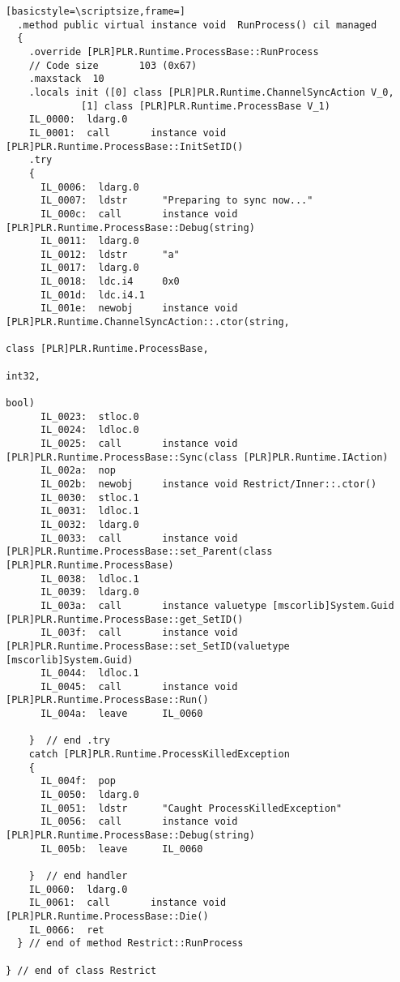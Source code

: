 \begin{lstlisting}[basicstyle=\scriptsize,frame=]
  .method public virtual instance void  RunProcess() cil managed
  {
    .override [PLR]PLR.Runtime.ProcessBase::RunProcess
    // Code size       103 (0x67)
    .maxstack  10
    .locals init ([0] class [PLR]PLR.Runtime.ChannelSyncAction V_0,
             [1] class [PLR]PLR.Runtime.ProcessBase V_1)
    IL_0000:  ldarg.0
    IL_0001:  call       instance void [PLR]PLR.Runtime.ProcessBase::InitSetID()
    .try
    {
      IL_0006:  ldarg.0
      IL_0007:  ldstr      "Preparing to sync now..."
      IL_000c:  call       instance void [PLR]PLR.Runtime.ProcessBase::Debug(string)
      IL_0011:  ldarg.0
      IL_0012:  ldstr      "a"
      IL_0017:  ldarg.0
      IL_0018:  ldc.i4     0x0
      IL_001d:  ldc.i4.1
      IL_001e:  newobj     instance void [PLR]PLR.Runtime.ChannelSyncAction::.ctor(string,
                                                                                   class [PLR]PLR.Runtime.ProcessBase,
                                                                                   int32,
                                                                                   bool)
      IL_0023:  stloc.0
      IL_0024:  ldloc.0
      IL_0025:  call       instance void [PLR]PLR.Runtime.ProcessBase::Sync(class [PLR]PLR.Runtime.IAction)
      IL_002a:  nop
      IL_002b:  newobj     instance void Restrict/Inner::.ctor()
      IL_0030:  stloc.1
      IL_0031:  ldloc.1
      IL_0032:  ldarg.0
      IL_0033:  call       instance void [PLR]PLR.Runtime.ProcessBase::set_Parent(class [PLR]PLR.Runtime.ProcessBase)
      IL_0038:  ldloc.1
      IL_0039:  ldarg.0
      IL_003a:  call       instance valuetype [mscorlib]System.Guid [PLR]PLR.Runtime.ProcessBase::get_SetID()
      IL_003f:  call       instance void [PLR]PLR.Runtime.ProcessBase::set_SetID(valuetype [mscorlib]System.Guid)
      IL_0044:  ldloc.1
      IL_0045:  call       instance void [PLR]PLR.Runtime.ProcessBase::Run()
      IL_004a:  leave      IL_0060

    }  // end .try
    catch [PLR]PLR.Runtime.ProcessKilledException 
    {
      IL_004f:  pop
      IL_0050:  ldarg.0
      IL_0051:  ldstr      "Caught ProcessKilledException"
      IL_0056:  call       instance void [PLR]PLR.Runtime.ProcessBase::Debug(string)
      IL_005b:  leave      IL_0060

    }  // end handler
    IL_0060:  ldarg.0
    IL_0061:  call       instance void [PLR]PLR.Runtime.ProcessBase::Die()
    IL_0066:  ret
  } // end of method Restrict::RunProcess

} // end of class Restrict


\end{lstlisting}
